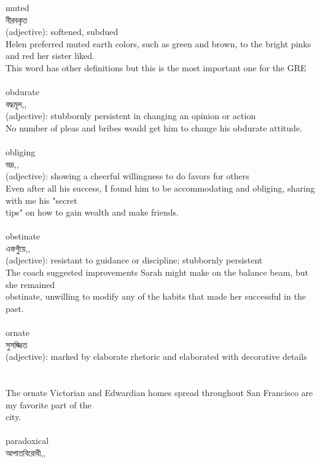 \documentclass{article}
\begin{document}
{muted}\\
{নীরবকৃত}\\
{(adjective): softened, subdued\\Helen preferred muted earth colors, such as green and brown, to the bright pinks and red her sister liked.\\This word has other definitions but this is the most important one for the GRE\\}\\
{obdurate}\\
{বদ্ধমূল,,}\\
{(adjective): stubbornly persistent in changing an opinion or action\\No number of pleas and bribes would get him to change his obdurate attitude.\\}\\
{obliging}\\
{ভদ্র,,}\\
{(adjective): showing a cheerful willingness to do favors for others\\Even after all his success, I found him to be accommodating and obliging, sharing with me his "secret\\tips" on how to gain wealth and make friends.\\}\\
{obstinate}\\
{একগুঁয়ে,,}\\
{(adjective): resistant to guidance or discipline; stubbornly persistent\\The coach suggested improvements Sarah might make on the balance beam, but she remained\\obstinate, unwilling to modify any of the habits that made her successful in the past.\\}\\
{ornate}\\
{সুসজ্জিত}\\
{(adjective): marked by elaborate rhetoric and elaborated with decorative details\\\\                                                                                 \\The ornate Victorian and Edwardian homes spread throughout San Francisco are my favorite part of the\\city.\\}\\
{paradoxical}\\
{আপাতবিরোধী,,}\\
\end{document}
